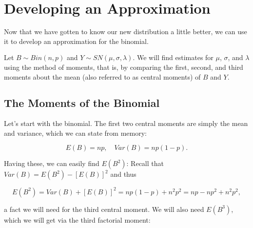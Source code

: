 \documentclass{article}
\begin{document}
\section{Developing an Approximation}
\label{sec:method-of-moments}

Now that we have gotten to know our new distribution a little better, we can
use it to develop an approximation for the binomial.

Let $B \sim Bin(n, p)$ and $Y \sim SN(\mu, \sigma, \lambda)$. We will find
estimates for $\mu$, $\sigma$, and $\lambda$ using the method of moments, that
is, by comparing the first, second, and third moments about the mean (also
referred to as central moments) of $B$ and $Y$.

\subsection{The Moments of the Binomial}

Let's start with the binomial. The first two central moments are simply the
mean and variance, which we can state from memory:

\begin{equation*}
  E(B) = np, \quad Var(B) = np(1-p).
\end{equation*}

Having these, we can easily find $E(B^2)$: Recall that $Var(B) = E(B^2) -
[E(B)]^2$ and thus

\begin{equation*}
  E(B^2) = Var(B) + [E(B)]^2 = np(1-p) + n^2p^2 = np - np^2 + n^2p^2,
\end{equation*}

a fact we will need for the third central moment. We will also need $E(B^3)$,
which we will get via the third factorial moment:
\end{document}
